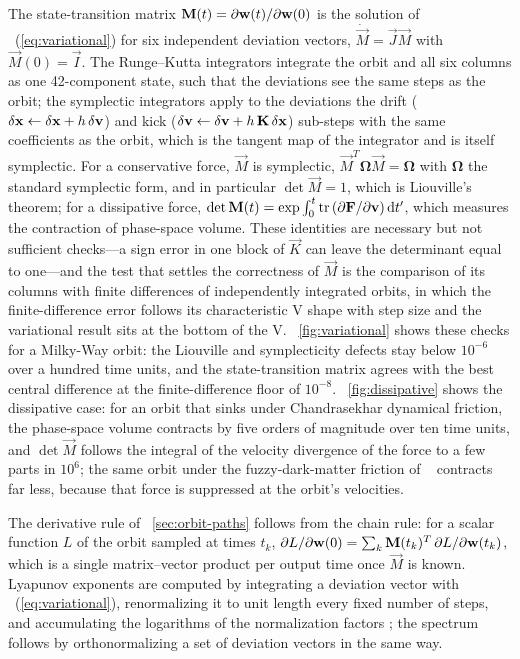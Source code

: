 The state-transition matrix $\mathbf{M}(t) = \partial\mathbf{w}(t)/\partial\mathbf{w}(0)$
is the solution of \eqnname~(\ref{eq:variational}) for six independent
deviation vectors, $\dot{\vec{M}} = \vec{J}\vec{M}$ with
$\vec{M}(0) = \vec{I}$. The Runge--Kutta integrators integrate the orbit
and all six columns as one 42-component state, such that the deviations
see the same steps as the orbit; the symplectic integrators apply to the
deviations the drift ($\delta\mathbf{x} \leftarrow \delta\mathbf{x} +
h\,\delta\mathbf{v}$) and kick ($\delta\mathbf{v} \leftarrow \delta\mathbf{v} +
h\,\mathbf{K}\,\delta\mathbf{x}$) sub-steps with the same coefficients as the
orbit, which is the tangent map of the integrator and is itself
symplectic. For a conservative force, $\vec{M}$ is symplectic,
$\vec{M}^T\boldsymbol{\Omega}\vec{M} = \boldsymbol{\Omega}$ with
$\boldsymbol{\Omega}$ the standard symplectic form, and in particular
$\det\vec{M} = 1$, which is Liouville's theorem; for a dissipative force,
$\det\mathbf{M}(t) = \exp\int_0^t \mathrm{tr}\,(\partial\mathbf{F}/\partial\mathbf{v})\,\mathrm{d} t'$,
which measures the contraction of phase-space volume. These identities
are necessary but not sufficient checks---a sign error in one block of
$\vec{K}$ can leave the determinant equal to one---and the test that
settles the correctness of $\vec{M}$ is the comparison of its columns
with finite differences of independently integrated orbits, in which the
finite-difference error follows its characteristic V shape with step
size and the variational result sits at the bottom of the V.
\figurename~\ref{fig:variational} shows these checks for a Milky-Way
orbit: the Liouville and symplecticity defects stay below $10^{-6}$ over
a hundred time units, and the state-transition matrix agrees with the
best central difference at the finite-difference floor of $10^{-8}$.
\figurename~\ref{fig:dissipative} shows the dissipative case: for an
orbit that sinks under Chandrasekhar dynamical friction, the phase-space
volume contracts by five orders of magnitude over ten time units, and
$\det\vec{M}$ follows the integral of the velocity divergence of the
force to a few parts in $10^{6}$; the same orbit under the fuzzy-dark-matter
friction of \galpy\ \citep{Szpilfidel2026} contracts far less, because
that force is suppressed at the orbit's velocities.

The derivative rule of \sectionname~\ref{sec:orbit-paths} follows from
the chain rule: for a scalar function $L$ of the orbit sampled at times
$t_k$, $\partial L/\partial\mathbf{w}(0) = \sum_k \mathbf{M}(t_k)^T\,
\partial L/\partial\mathbf{w}(t_k)$, which is a single matrix--vector product
per output time once $\vec{M}$ is known. Lyapunov exponents are
computed by integrating a deviation vector with
\eqnname~(\ref{eq:variational}), renormalizing it to unit length every
fixed number of steps, and accumulating the logarithms of the
normalization factors \citep{Benettin1980a,Benettin1980b}; the spectrum follows by
orthonormalizing a set of deviation vectors in the same way.
